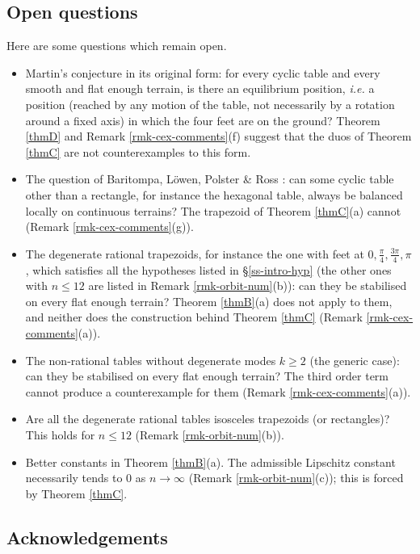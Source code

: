 \documentclass[a4paper,11pt,twoside,leqno]{article}
\newcommand{\ie}[0]{\emph{i.e.} }
\numberwithin{equation}{section}
\begin{document}
\subsection{Open questions}\label{ss-open}

Here are some questions which remain open.
\begin{itemize}
 \item Martin's conjecture \cite[\S{}4]{Mar} in its original form: for every cyclic table and every smooth and flat enough terrain, is there an equilibrium position, \ie a position (reached by any motion of the table, not necessarily by a rotation around a fixed axis) in which the four feet are on the ground? Theorem \ref{thmD} and Remark \ref{rmk-cex-comments}(f) suggest that the duos of Theorem \ref{thmC} are not counterexamples to this form.
 \item The question of Baritompa, L\"owen, Polster \& Ross \cite[\S{}4]{BLPR}: can some cyclic table other than a rectangle, for instance the hexagonal table, always be balanced locally on continuous terrains? The trapezoid of Theorem \ref{thmC}(a) cannot (Remark \ref{rmk-cex-comments}(g)).
 \item The degenerate rational trapezoids, for instance the one with feet at $0, \frac{\pi}{4}, \frac{3\pi}{4}, \pi$, which satisfies all the hypotheses listed in \S{}\ref{ss-intro-hyp} (the other ones with $n \leq 12$ are listed in Remark \ref{rmk-orbit-num}(b)): can they be stabilised on every flat enough terrain? Theorem \ref{thmB}(a) does not apply to them, and neither does the construction behind Theorem \ref{thmC} (Remark \ref{rmk-cex-comments}(a)).
 \item The non-rational tables without degenerate modes $k \geq 2$ (the generic case): can they be stabilised on every flat enough terrain? The third order term cannot produce a counterexample for them (Remark \ref{rmk-cex-comments}(a)).
 \item Are all the degenerate rational tables isosceles trapezoids (or rectangles)? This holds for $n \leq 12$ (Remark \ref{rmk-orbit-num}(b)).
 \item Better constants in Theorem \ref{thmB}(a). The admissible Lipschitz constant necessarily tends to $0$ as $n \to \infty$ (Remark \ref{rmk-orbit-num}(c)); this is forced by Theorem \ref{thmC}.
\end{itemize}

\subsection*{Acknowledgements}
\end{document}
